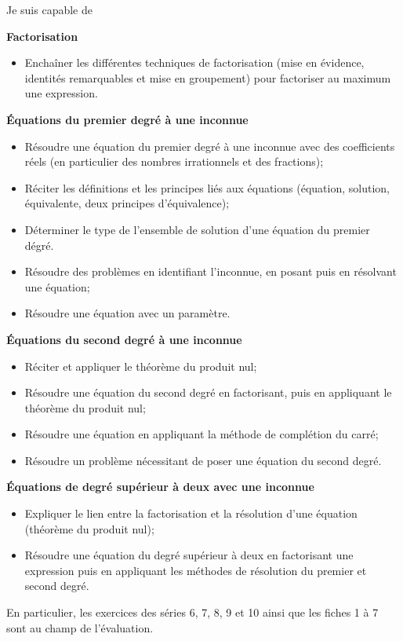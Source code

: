 \documentclass[a4paper,12pt]{report}
\begin{document}
Je suis capable de

{\bfseries Factorisation}
\begin{itemize}
	\item Enchaîner les différentes techniques de factorisation (mise en évidence, identités remarquables et mise en groupement) pour factoriser au maximum une expression.
\end{itemize}
{\bfseries Équations du premier degré à une inconnue}
\begin{itemize}
	\item Résoudre une équation du premier degré à une inconnue avec des coefficients réels (en particulier des nombres irrationnels et des fractions);
	\item Réciter les définitions et les principes liés aux équations (équation, solution, équivalente, deux principes d'équivalence);
	\item Déterminer le type de l'ensemble de solution d'une équation du premier dégré.
	\item Résoudre des problèmes en identifiant l'inconnue, en posant puis en résolvant une équation;
	\item Résoudre une équation avec un paramètre.
\end{itemize}
{\bfseries Équations du second degré à une inconnue}
\begin{itemize}
	\item Réciter et appliquer le théorème du produit nul;
	\item Résoudre une équation du second degré en factorisant, puis en appliquant le théorème du produit nul;
	\item Résoudre une équation en appliquant la méthode de complétion du carré;
	\item Résoudre un problème nécessitant de poser une équation du second degré.
\end{itemize}
{\bfseries Équations de degré supérieur à deux avec une inconnue}
\begin{itemize}
	\item Expliquer le lien entre la factorisation et la résolution d'une équation (théorème du produit nul);
	\item Résoudre une équation du degré supérieur à deux en factorisant une expression puis en appliquant les méthodes de résolution du premier et second degré. 
\end{itemize}

En particulier, les exercices des séries 6, 7, 8, 9 et 10 ainsi que les fiches 1 à 7 sont au champ de l'évaluation.
\end{document}
